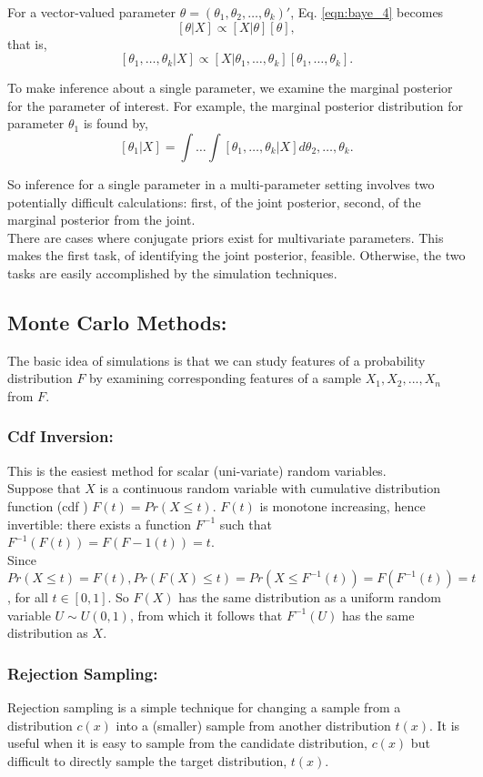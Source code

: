 					For a vector-valued parameter $\theta = (\theta_1,\theta_2,\dots,\theta_k)'$, Eq. \eqref{eqn:baye_4} becomes \[[\theta|X] \propto [X|\theta][\theta],\] that is, \[ [\theta_1,\dots,\theta_k|X] \propto [X|\theta_1,\dots,\theta_k][\theta_1,\dots,\theta_k]. \]

					To make inference about a single parameter, we examine the marginal posterior for the parameter of interest. For example, the marginal posterior distribution for parameter $\theta_1$ is found by, \[ [\theta_1|X] = \int\dots\int [\theta_1,\dots,\theta_k|X]d\theta_2,\dots, \theta_k. \]

					So inference for a single parameter in a multi-parameter setting involves two potentially difficult calculations: first, of the joint posterior, second, of the marginal posterior from the joint.\\

					There are cases where conjugate priors exist for multivariate parameters. This makes the first task, of identifying the joint posterior, feasible. Otherwise, the two tasks are easily accomplished by the simulation techniques.\cite{link2009bayesian}


			\subsection{Monte Carlo Methods:}
				The basic idea of simulations is that we can study features of a probability distribution $F$ 	by examining corresponding features of a sample $X_1, X_2, . . . , X_n$ from $F$.

				\subsubsection{Cdf Inversion:}
					This is the easiest method for scalar (uni-variate) random variables.\\
					Suppose that $X$ is a continuous random variable with cumulative distribution function (cdf ) $F(t) = Pr(X \le t)$.
					$F(t)$ is monotone increasing, hence invertible: there exists a function $F^{-1}$ such that $F^{-1}(F(t)) = F(F-1(t)) = t$.\\
					Since $Pr(X \le t) = F(t), Pr(F(X) \le t) = Pr(X \le F^{-1}(t)) = F(F^{-1}(t)) = t$, for all $t\in [0, 1]$. So $F(X)$ has the same distribution as a uniform random variable $U \sim U(0,1)$, from which it follows that $F^{-1}(U)$ has the same distribution as $X$.

				\subsubsection{Rejection Sampling:}
					Rejection sampling is a simple technique for changing a sample from a distribution $c(x)$ into a (smaller) sample from another distribution $t(x)$. It is useful when it is easy to sample from the candidate distribution, $c(x)$ but difficult to directly sample the target distribution, $t(x)$.

